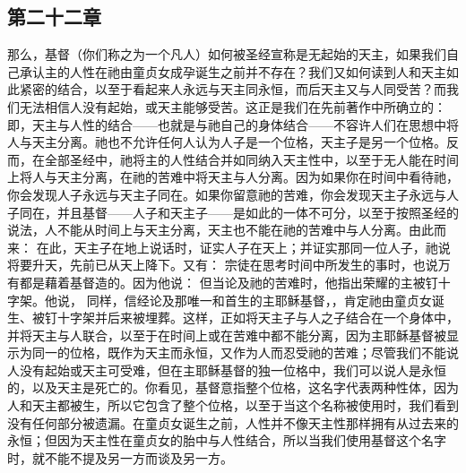 \subsection{第二十二章}

\par

那么，基督（你们称之为一个凡人）如何被圣经宣称是无起始的天主，如果我们自己承认主的人性在祂由童贞女成孕诞生之前并不存在？我们又如何读到人和天主如此紧密的结合，以至于看起来人永远与天主同永恒，而后天主又与人同受苦？而我们无法相信人没有起始，或天主能够受苦。这正是我们在先前著作中所确立的：即，天主与人性的结合——也就是与祂自己的身体结合——不容许人们在思想中将人与天主分离。祂也不允许任何人认为人子是一个位格，天主子是另一个位格。反而，在全部圣经中，祂将主的人性结合并如同纳入天主性中，以至于无人能在时间上将人与天主分离，在祂的苦难中将天主与人分离。因为如果你在时间中看待祂，你会发现人子永远与天主子同在。如果你留意祂的苦难，你会发现天主子永远与人子同在，并且基督——人子和天主子——是如此的一体不可分，以至于按照圣经的说法，人不能从时间上与天主分离，天主也不能在祂的苦难中与人分离。由此而来： 在此，天主子在地上说话时，证实人子在天上；并证实那同一位人子，祂说将要升天，先前已从天上降下。又有： 宗徒在思考时间中所发生的事时，也说万有都是藉着基督造的。因为他说： 但当论及祂的苦难时，他指出荣耀的主被钉十字架。他说， 同样，信经论及那唯一和首生的主耶稣基督，，肯定祂由童贞女诞生、被钉十字架并后来被埋葬。这样，正如将天主子与人之子结合在一个身体中，并将天主与人联合，以至于在时间上或在苦难中都不能分离，因为主耶稣基督被显示为同一的位格，既作为天主而永恒，又作为人而忍受祂的苦难；尽管我们不能说人没有起始或天主可受难，但在主耶稣基督的独一位格中，我们可以说人是永恒的，以及天主是死亡的。你看见，基督意指整个位格，这名字代表两种性体，因为人和天主都被生，所以它包含了整个位格，以至于当这个名称被使用时，我们看到没有任何部分被遗漏。在童贞女诞生之前，人性并不像天主性那样拥有从过去来的永恒；但因为天主性在童贞女的胎中与人性结合，所以当我们使用基督这个名字时，就不能不提及另一方而谈及另一方。\par


